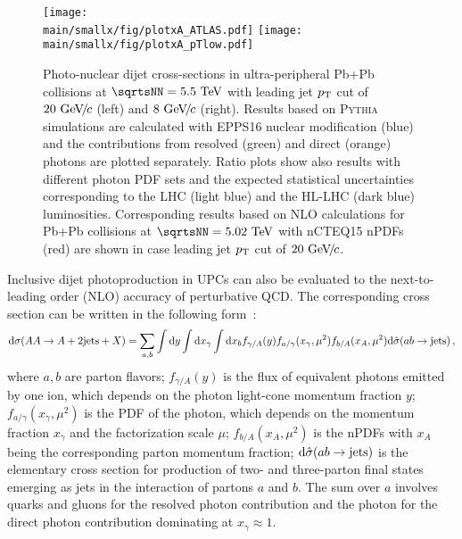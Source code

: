 \documentclass[../report.tex]{subfiles}
\providecommand{\main}{..}
\begin{document}
\begin{figure}
\texttt{[image: \\main/smallx/fig/plotxA\_ATLAS.pdf]}
\texttt{[image: \\main/smallx/fig/plotxA\_pTlow.pdf]}
\caption{Photo-nuclear dijet cross-sections in ultra-peripheral Pb+Pb collisions at $\sqrtsNN = 5.5\UTeV$ with leading jet $p\sb{\scriptstyle\mathrm{T}}$ cut of $20~\text{GeV}\!/\mspace{-2mu}c$ (left) and $8~\text{GeV}\!/\mspace{-2mu}c$ (right). Results based on \textsc{Pythia} simulations are calculated with EPPS16 nuclear modification (blue) and the contributions from resolved (green) and direct (orange) photons are plotted separately. Ratio plots show also results with different photon PDF sets and the expected statistical uncertainties corresponding to the LHC (light blue) and the HL-LHC (dark blue) luminosities. Corresponding results based on NLO calculations for Pb+Pb collisions at $\sqrtsNN = 5.02\UTeV$ with nCTEQ15 nPDFs (red) are shown in case leading jet $p\sb{\scriptstyle\mathrm{T}}$ cut of $20~\text{GeV}\!/\mspace{-2mu}c$.}
\label{fig:UPCdijetNPDF}
\end{figure}

Inclusive dijet photoproduction in UPCs can also be evaluated to the next-to-leading order (NLO) accuracy of perturbative QCD. The corresponding cross section can be written in the following form~\cite{Klasen:2002xb}:
 \begin{eqnarray}
 \mathrm{d} \sigma(AA \to A+{\rm 2 jets}+X) = \sum_{a,b} \int \mathrm{d} y \int \mathrm{d} x_{\gamma} \int \mathrm{d} x_b f_{\gamma/A}(y)f_{a/\gamma}(x_{\gamma},\mu^2)f_{b/A}(x_A,\mu^2) \mathrm{d} \hat{\sigma}(ab \to {\rm jets}) \,,
\label{eq:cs_jets}
\end{eqnarray}
where $a,b$ are parton flavors; $f_{\gamma/A}(y)$ is the flux of equivalent photons emitted by one ion,
which depends on the photon light-cone momentum fraction $y$;
$f_{a/\gamma}(x_{\gamma},\mu^2)$ is the PDF of the photon, which depends on the momentum fraction $x_{\gamma}$ 
and the factorization scale $\mu$; $f_{b/A}(x_A,\mu^2)$ is the nPDFs with $x_A$ being the corresponding parton momentum fraction;
$\mathrm{d} \hat{\sigma}(ab \to {\rm jets})$ is the elementary cross section for production of two- and three-parton final states emerging as jets
 in the interaction of partons $a$ and $b$. The sum over $a$ involves quarks and gluons for the resolved photon contribution 
 and the photon for the direct photon contribution dominating at $x_{\gamma} \approx 1$.
 
\end{document}
